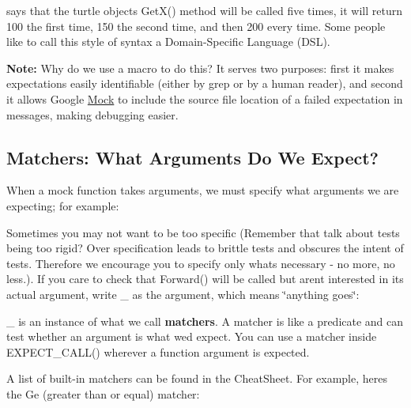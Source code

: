 says that the {\ttfamily turtle} object\textquotesingle{}s {\ttfamily Get\+X()} method will be called five times, it will return 100 the first time, 150 the second time, and then 200 every time. Some people like to call this style of syntax a Domain-\/\+Specific Language (D\+SL).

{\bfseries{Note\+:}} Why do we use a macro to do this? It serves two purposes\+: first it makes expectations easily identifiable (either by {\ttfamily grep} or by a human reader), and second it allows Google \mbox{\hyperlink{class_mock}{Mock}} to include the source file location of a failed expectation in messages, making debugging easier.

\subsection*{Matchers\+: What Arguments Do We Expect?}

When a mock function takes arguments, we must specify what arguments we are expecting; for example\+:


\begin{DoxyCode}{0}
\end{DoxyCode}


Sometimes you may not want to be too specific (Remember that talk about tests being too rigid? Over specification leads to brittle tests and obscures the intent of tests. Therefore we encourage you to specify only what\textquotesingle{}s necessary -\/ no more, no less.). If you care to check that {\ttfamily Forward()} will be called but aren\textquotesingle{}t interested in its actual argument, write {\ttfamily \+\_\+} as the argument, which means \char`\"{}anything goes\char`\"{}\+:


\begin{DoxyCode}{0}
\end{DoxyCode}


{\ttfamily \+\_\+} is an instance of what we call {\bfseries{matchers}}. A matcher is like a predicate and can test whether an argument is what we\textquotesingle{}d expect. You can use a matcher inside {\ttfamily E\+X\+P\+E\+C\+T\+\_\+\+C\+A\+L\+L()} wherever a function argument is expected.

A list of built-\/in matchers can be found in the Cheat\+Sheet. For example, here\textquotesingle{}s the {\ttfamily Ge} (greater than or equal) matcher\+:


